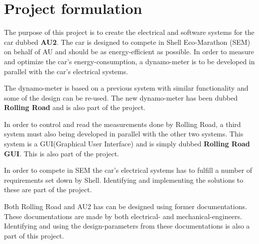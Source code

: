\chapter{Project formulation}
The purpose of this project is to create the electrical and software systems for the car dubbed \textbf{AU2}. The car is designed to compete in Shell Eco-Marathon (SEM) on behalf of AU and should be as energy-efficient as possible. In order to measure and optimize the car's energy-consumption, a dynamo-meter is to be developed in parallel with the car's electrical systems. 

The dynamo-meter is based on a previous system with similar functionality\cite{BAC_rullefelt} and some of the design can be re-used. The new dynamo-meter has been dubbed \textbf{Rolling Road} and is also part of the project.

In order to control and read the measurements done by Rolling Road, a third system must also being developed in parallel with the other two systems. This system is a GUI(Graphical User Interface) and is simply dubbed \textbf{Rolling Road GUI}. This is also part of the project.

In order to compete in SEM the car's electrical systems has to fulfill a number of requirements set down by Shell\cite{AU2}. Identifying and implementing the solutions to these are part of the project.

Both Rolling Road and AU2 has can be designed using former documentations\cite{BAC_rullefelt}\cite{BAC_zenith33}. These documentations are made by both electrical- and mechanical-engineers. Identifying and using the design-parameters from these documentations is also a part of this project.

\newpage
